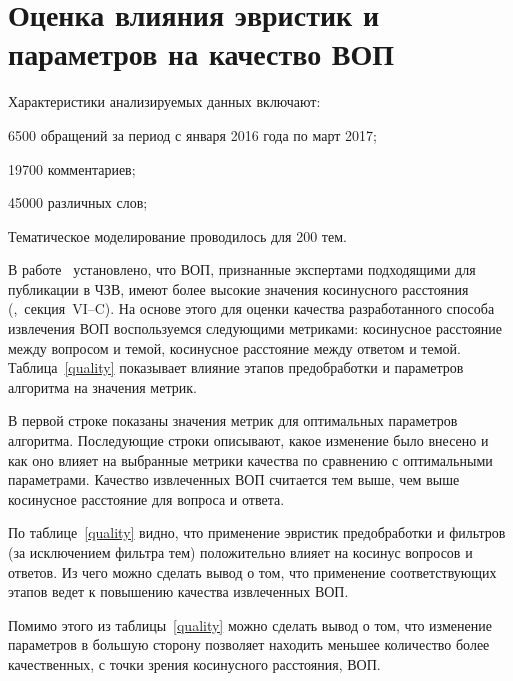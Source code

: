 \section{Оценка влияния эвристик и параметров на качество ВОП}

Характеристики анализируемых данных включают:

\begin{itemize*}
\item 6500 обращений за период с января 2016 года по март 2017;
\item 19700 комментариев;
\item 45000 различных слов;
\item Тематическое моделирование проводилось для 200 тем.
\end{itemize*}

В работе~\cite{original} установлено, что ВОП, признанные экспертами подходящими для публикации в ЧЗВ, имеют более высокие значения косинусного расстояния (\cite{original},~секция~VI--C). На основе этого для оценки качества разработанного способа извлечения ВОП воспользуемся следующими метриками: косинусное расстояние между вопросом и темой, косинусное расстояние между ответом и темой. Таблица~\ref{quality} показывает влияние этапов предобработки и параметров алгоритма на значения метрик. 

В первой строке показаны значения метрик для оптимальных параметров алгоритма. Последующие строки описывают, какое изменение было внесено и как оно влияет на выбранные метрики качества по сравнению с оптимальными параметрами. Качество извлеченных ВОП считается тем выше, чем выше косинусное расстояние для вопроса и ответа.

По таблице~\ref{quality} видно, что применение эвристик предобработки и фильтров (за исключением фильтра тем) положительно влияет на косинус вопросов и ответов. Из чего можно сделать вывод о том, что применение соответствующих этапов ведет к повышению качества извлеченных ВОП. 

Помимо этого из таблицы~\ref{quality} можно сделать вывод о том, что изменение параметров в большую сторону позволяет находить меньшее количество более качественных, с точки зрения косинусного расстояния, ВОП. 

